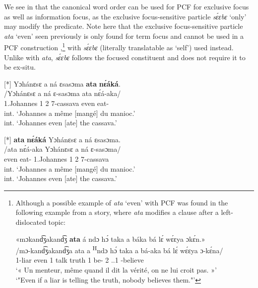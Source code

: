 \documentclass[output=paper,colorlinks,citecolor=brown
]{langscibook}
\begin{document}
We see in  that the canonical word order can be used for PCF for exclusive focus as well as information focus, as the exclusive focus-sensitive particle \textit{sɛ́ɛbɛ} `only' may modify the predicate. Note here that the exclusive focus-sensitive particle \textit{ata} `even' seen previously is only found for term focus and cannot be used in a PCF construction ,\footnote{Although a possible example of \textit{ata} `even' with PCF was found in the following example from a story, where \textit{ata} modifies a clause after a left-dislocated topic:

\ea
\glll
{\db}«mɔkand͡ʒakand͡ʒ \textbf{ata} á ndɔ hɔ́ taka a báka bá lɛ́ wɛ́ɛya ɔkɛ́n.» \\
/mɔ-kand͡ʒakand͡ʒa ata a \textsuperscript{H}ndɔ hɔ́ taka a bá-aka bá lɛ́ wɛ́ɛya ɔ-kɛ́na/ \\
{\db}1-liar even 1\SM{} \PRS{} talk truth 1\SM{} be-\DUR{} 2\SM{} \NEG{} \PRO{}.\EMPH{}.1{} \INF{}-believe \\
\glt
`« Un menteur, même quand il dit la vérité, on ne lui croit pas. »' \\ `"Even if a liar is telling the truth, nobody believes them."' \jambox*{[JO 2039] }

\z} with \textit{sɛ́ɛbɛ} (literally translatable as `self') used instead. Unlike with \textit{ata}, \textit{sɛ́ɛbɛ} follows the focused constituent and does not require it to be ex-situ.

\ea\label{noatapcf}
\ea
[*]{
\glll
{\db}Yɔhánɛsɛ	a ná	ɛsasɔma	\textbf{ata}	\textbf{nɛ́áká}. \\
/Yɔhánɛsɛ	a ná	ɛ-sasɔma	ata	nɛ́á-aka/ \\
{\db}1.Johannes	1\SM{} \PST{}2{}	7-cassava	even	eat-\DUR{} \\
\glt
int. `Johannes a même [mangé]\textsubscript{\FOC{}} du manioc.' \\ int. `Johannes even [ate]\textsubscript{\FOC{}} the cassava.' \jambox*{[PM 2284] }
}

\ex
[*]{
\glll
{\db}\textbf{ata}	\textbf{nɛ́áká}	Yɔhánɛsɛ	a ná	ɛsasɔma. \\
/ata	nɛ́á-aka	Yɔhánɛsɛ	a ná	ɛ-sasɔma/ \\
{\db}even	eat-\DUR{}	1.Johannes	1\SM{} \PST{}2{}	7-cassava \\
\glt
int. `Johannes a même [mangé]\textsubscript{\FOC{}} du manioc.' \\ int. `Johannes even [ate]\textsubscript{\FOC{}} the cassava.' \jambox*{[PM 2285] }
}
\end{document}
